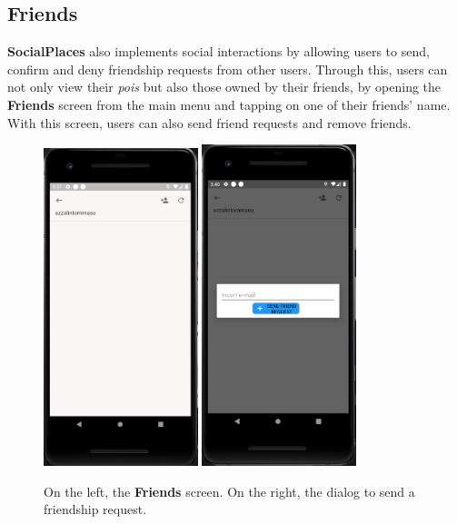 \documentclass[../../main]{subfiles}
\begin{document}
\subsection{Friends}
\label{ss:final-friends}

\textbf{SocialPlaces} also implements social interactions by allowing users to send, confirm and deny friendship requests from other users.
Through this, users can not only view their \textit{pois} but also those owned by their friends, by opening the \textbf{Friends} screen from the main menu and tapping on one of their friends' name.
With this screen, users can also send friend requests and remove friends.
\begin{figure}[H]
    \centering
    \includegraphics[width=0.4\textwidth]{images/app/friend/friend_overwiew}
    \includegraphics[width=0.4\textwidth]{images/app/friend/send_request}
    \caption{On the left, the \textbf{Friends} screen. On the right, the dialog to send a friendship request.}
\end{figure}
\end{document}
